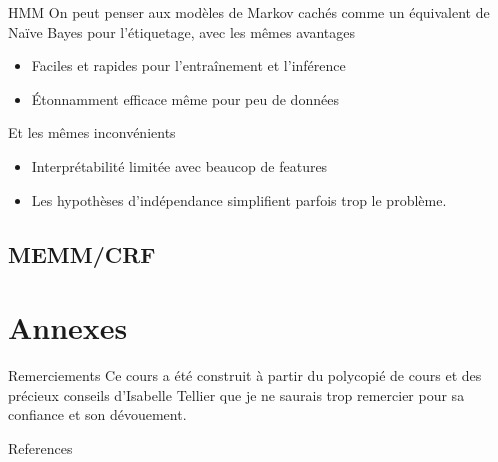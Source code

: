 \documentclass[hyperref={unicode}, xcolor={svgnames}, french]{beamer}
\begin{document}
\begin{frame}{HMM}
	On peut penser aux modèles de Markov cachés comme un équivalent de Naïve Bayes pour l'étiquetage, avec les mêmes avantages
	\begin{itemize}
		\item Faciles et rapides pour l'entraînement et l'inférence
		\item Étonnamment efficace même pour peu de données
	\end{itemize}
	Et les mêmes inconvénients
	\begin{itemize}
		\item Interprétabilité limitée avec beaucop de features
		\item Les hypothèses d'indépendance simplifient parfois trop le problème.
	\end{itemize}
\end{frame}

\subsection{MEMM/CRF}



\appendix
{}  %
\section{Annexes}
\begin{frame}{Remerciements}
    Ce cours a été construit à partir du polycopié de cours  \parencite{tellier2017fouille} et des précieux conseils d'Isabelle Tellier que je ne saurais trop remercier pour sa confiance et son dévouement.
\end{frame}

\begin{frame}[allowframebreaks]{References}
    \printbibliography[heading=none]
\end{frame}
\end{document}
